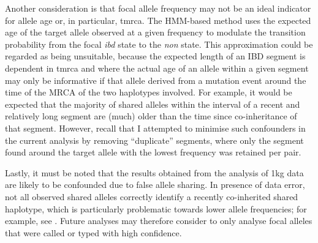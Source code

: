 Another consideration is that focal allele frequency may not be an ideal indicator for allele age or, in particular, \gls{tmrca}.
The HMM-based method uses the expected age of the target allele observed at a given frequency to modulate the transition probability from the focal \emph{ibd} state to the \emph{non} state.
This approximation could be regarded as being unsuitable, because the expected length of an IBD segment is dependent in \gls{tmrca} and where the actual age of an allele within a given segment may only be informative if that allele derived from a mutation event around the time of the MRCA of the two haplotypes involved.
For example, it would be expected that the majority of shared alleles within the interval of a recent and relatively long segment are (much) older than the time since co-inheritance of that segment.
However, recall that I attempted to minimise such confounders in the current analysis by removing ``duplicate'' segments, where only the segment found around the target allele with the lowest frequency was retained per pair.


Lastly, it must be noted that the results obtained from the analysis of \gls{1kg} data are likely to be confounded due to false allele sharing.
In presence of data error, not all observed shared alleles correctly identify a recently co-inherited shared haplotype, which is particularly problematic towards lower allele frequencies; for example, see .
Future analyses may therefore consider to only analyse focal alleles that were called or typed with high confidence.




